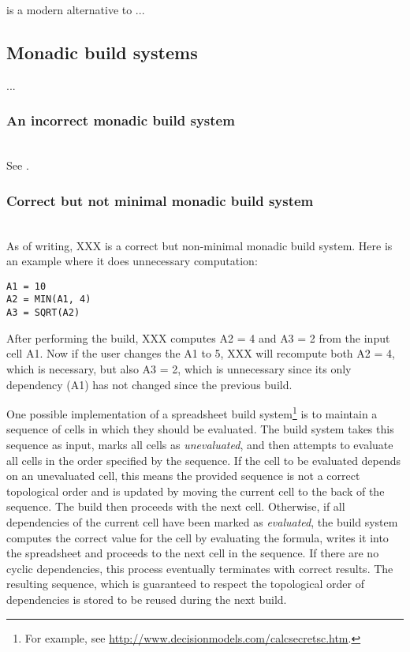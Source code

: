 \Ninja is a modern alternative to \Make ...



\subsection{Monadic build systems}

...
\subsubsection{An incorrect monadic build system}~\\

See .

\subsubsection{Correct but not minimal monadic build system}~\\

As of writing, XXX is a correct but non-minimal monadic build system. Here is
an example where it does unnecessary computation:

\begin{verbatim}
A1 = 10
A2 = MIN(A1, 4)
A3 = SQRT(A2)
\end{verbatim}

After performing the build, XXX computes \textsf{A2 = 4} and \textsf{A3 = 2}
from the input cell \textsf{A1}. Now if the user changes the \textsf{A1} to 5,
XXX will recompute both \textsf{A2 = 4}, which is necessary, but also
\textsf{A3 = 2}, which is unnecessary since its only dependency (\textsf{A1})
has not changed since the previous build.

One possible implementation of a spreadsheet build
system\footnote{For example, see \url{http://www.decisionmodels.com/calcsecretsc.htm}.}
is to maintain a
sequence of cells in which they should be evaluated. The build system takes this
sequence as input, marks all cells as \emph{unevaluated}, and then attempts to
evaluate all cells in the order specified by the sequence. If the cell to be
evaluated depends on an unevaluated cell, this means the provided sequence is
not a correct topological order and is updated by moving the current cell to the
back of the sequence. The build then proceeds with the next cell. Otherwise, if
all dependencies of the current cell have been marked as \emph{evaluated}, the
build system computes the correct value for the cell by evaluating the formula,
writes it into the spreadsheet and proceeds to the next cell in the sequence. If
there are no cyclic dependencies, this process eventually terminates with
correct results. The resulting sequence, which is guaranteed to respect the
topological order of dependencies is stored to be reused during the next build.

